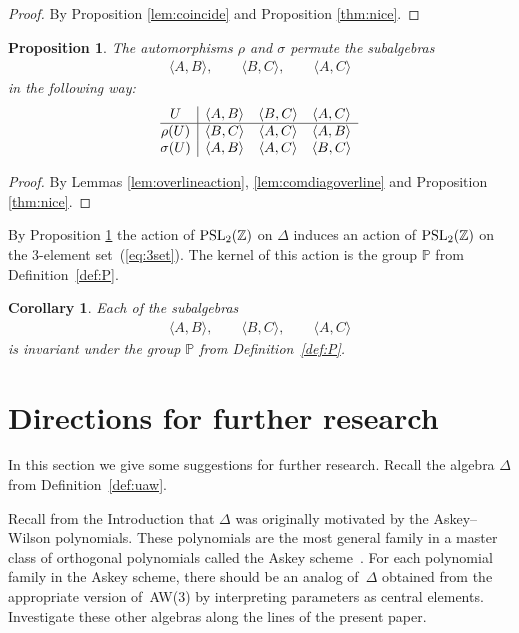 \documentclass[pdftex]{sigma}
\numberwithin{equation}{section}
\newtheorem{Corollary}[Theorem]{Corollary}
\newtheorem{Proposition}[Theorem]{Proposition}
{\theoremstyle{definition}
\newtheorem{Note}[Theorem]{Note}
\newtheorem{Definition}[Theorem]{Definition}
\newtheorem{Problem}[Theorem]{Problem}
}
\begin{document}
\begin{proof}
By Proposition
\ref{lem:coincide} and
Proposition \ref{thm:nice}.
\end{proof}

\begin{Proposition}
\label{prop:groupaction}
The automorphisms $\rho$ and $\sigma$
permute
the subalgebras
\begin{gather}
\label{eq:3set}
\langle A,B\rangle, \qquad
\langle B,C\rangle,\qquad
\langle A,C\rangle
\end{gather}
in the following way:
\[
\begin{array}{@{}c|ccc }
U &
\langle A,B\rangle  & \langle B,C\rangle   & \langle A,C\rangle
\\
\hline
\rho(U) &
\langle B,C\rangle  & \langle A,C\rangle   & \langle A,B\rangle
\\
\sigma(U)  &
\langle A,B\rangle  & \langle A,C\rangle   & \langle B,C\rangle
\end{array}
\]
\end{Proposition}

\begin{proof}
By Lemmas
\ref{lem:overlineaction},
\ref{lem:comdiagoverline}
and
Proposition \ref{thm:nice}.
\end{proof}

 By
Proposition
\ref{prop:groupaction}
the action of
${\rm  {PSL}}_2(\mathbb Z)$ on $\Delta$
induces an action of
${\rm  {PSL}}_2(\mathbb Z)$ on the 3-element
set~(\ref{eq:3set}).
The kernel of this action is
the
group $\mathbb P$ from
Def\/inition~\ref{def:P}.

\begin{Corollary}
\label{prop:P}
Each of the subalgebras
\begin{gather*}
\langle A,B\rangle, \qquad
\langle B,C\rangle,\qquad
\langle A,C\rangle
\end{gather*}
is invariant under the group $\mathbb P$ from Definition~{\rm \ref{def:P}}.
\end{Corollary}


\section{Directions for further research}

  In this section we give some suggestions
for further research.
Recall the algebra $\Delta $  from
Def\/inition~\ref{def:uaw}.



\begin{Problem}
Recall from the Introduction that $\Delta$
was originally motivated by the Askey--Wilson polynomials.
These polynomials are the most general
family
in a master class of ortho\-go\-nal polynomials called the
Askey scheme~\cite{KoeSwa}. For each polynomial
family
in the Askey scheme, there should be an analog of~$\Delta$
obtained from the appropriate version of~AW(3) by
interpreting parameters as central elements.
Investigate these other algebras along
the lines of the present paper.
\end{Problem}
\end{document}
